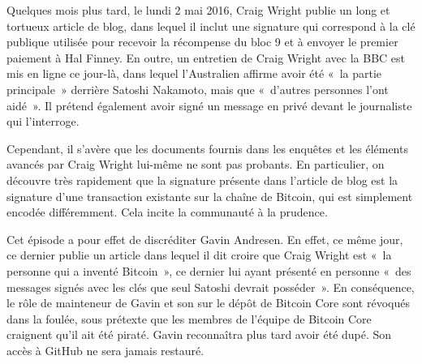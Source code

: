 Quelques mois plus tard, le lundi 2 mai 2016, Craig Wright publie un long et tortueux article de blog, dans lequel il inclut une signature qui correspond à la clé publique utilisée pour recevoir la récompense du bloc 9 et à envoyer le premier paiement à Hal Finney. En outre, un entretien de Craig Wright avec la BBC est mis en ligne ce jour-là, dans lequel l'Australien affirme avoir été «~la partie principale~» derrière Satoshi Nakamoto, mais que «~d'autres personnes l'ont aidé~». Il prétend également avoir signé un message en privé devant le journaliste qui l'interroge.

Cependant, il s'avère que les documents fournis dans les enquêtes et les éléments avancés par Craig Wright lui-même ne sont pas probants. En particulier, on découvre très rapidement que la signature présente dans l'article de blog est la signature d'une transaction existante sur la chaîne de Bitcoin, qui est simplement encodée différemment. Cela incite la communauté à la prudence.

Cet épisode a pour effet de discréditer Gavin Andresen. En effet, ce même jour, ce dernier publie un article dans lequel il dit croire que Craig Wright est «~la personne qui a inventé Bitcoin~», ce dernier lui ayant présenté en personne «~des messages signés avec les clés que seul Satoshi devrait posséder~». En conséquence, le rôle de mainteneur de Gavin et son  sur le dépôt de Bitcoin Core sont révoqués dans la foulée, sous prétexte que les membres de l'équipe de Bitcoin Core craignent qu'il ait été piraté. Gavin reconnaîtra plus tard avoir été dupé. Son accès à GitHub ne sera jamais restauré.

